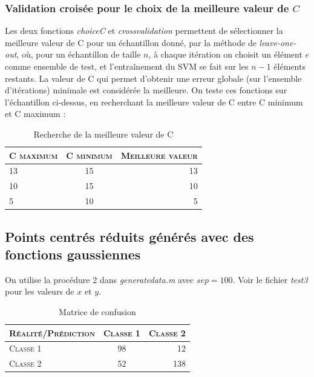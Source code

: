 \documentclass{article}
\begin{document}
\subsubsection{Validation croisée pour le choix de la meilleure valeur de $C$}

Les deux fonctions \emph{choiceC} et \emph{crossvalidation} permettent de sélectionner la meilleure valeur de C pour un échantillon donné, par la méthode de \emph{leave-one-out}, où, pour un échantillon de taille $n$, à chaque itération on choisit un élément $e$ comme ensemble de test, et l'entraînement du SVM se fait sur les $n-1$ éléments restants. La valeur de C qui permet d'obtenir une erreur globale (sur l'ensemble d'itérations) minimale est considérée la meilleure. On teste ces fonctions sur l'échantillon ci-dessus, en recherchant la meilleure valeur de C entre C minimum et C maximum :\\

     \begin{table}[H]
       \caption{Recherche de la meilleure valeur de C}
       \begin{tabular}{|l|c|r|}
         \hline
         \textsc{C maximum} & \textsc{C minimum} & \textsc{Meilleure valeur}\\
         \hline
         13 & 15 & 13\\
         \hline
         10 & 15 & 10\\
         \hline
         5 & 10 & 5\\
         \hline
       \end{tabular}
     \end{table}

\subsection{Points centrés réduits générés avec des fonctions gaussiennes}

On utilise la procédure 2 dans \emph{generatedata.m} avec $sep=100$. Voir le fichier \emph{test3} pour les valeurs de $x$ et $y$.

     \begin{table}[H]
       \caption{Matrice de confusion}
       \begin{tabular}{|l|c|r|}
         \hline
         \textsc{Réalité/Prédiction} & \textsc{Classe 1} & \textsc{Classe 2}\\
         \hline
         \textsc{Classe 1} & 98 & 12\\
         \hline
         \textsc{Classe 2} & 52 & 138\\
         \hline
       \end{tabular}
     \end{table}
\end{document}
